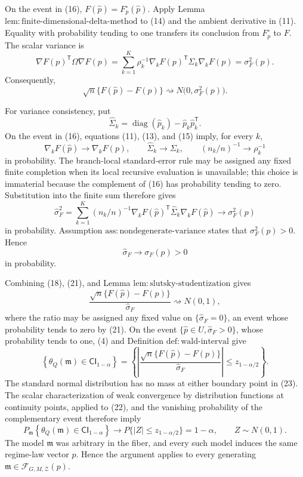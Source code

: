On the event in (16), \(F(\widehat p)=F_p^{\circ}(\widehat p)\).  Apply Lemma \(\mathrm{lem:finite\text{-}dimensional\text{-}delta\text{-}method}\) to (14) and the ambient derivative in (11).  Equality with probability tending to one transfers its conclusion from \(F_p^{\circ}\) to \(F\).  The scalar variance is
\[
 \nabla F(p)^{\mathsf T}\Omega\nabla F(p)
 =\sum_{k=1}^{K}\rho_k^{-1}
   \nabla_kF(p)^{\mathsf T}\Sigma_k\nabla_kF(p)
 =\sigma_F^2(p). \tag{17}
\]
Consequently,
\[
 \sqrt n\{F(\widehat p)-F(p)\}
 \rightsquigarrow N\bigl(0,\sigma_F^2(p)\bigr). \tag{18}
\]

For variance consistency, put
\[
 \widehat\Sigma_k
 =\operatorname{diag}(\widehat p_k)
  -\widehat p_k\widehat p_k^{\mathsf T}.
\]
On the event in (16), equations (11), (13), and (15) imply, for every \(k\),
\[
 \nabla_kF(\widehat p)\to\nabla_kF(p),
 \qquad
 \widehat\Sigma_k\to\Sigma_k,
 \qquad
 (n_k/n)^{-1}\to\rho_k^{-1} \tag{19}
\]
in probability.  The branch-local standard-error rule may be assigned any fixed finite completion when its local recursive evaluation is unavailable; this choice is immaterial because the complement of (16) has probability tending to zero.  Substitution into the finite sum therefore gives
\[
 \widehat\sigma_F^2
 =\sum_{k=1}^{K}(n_k/n)^{-1}
   \nabla_kF(\widehat p)^{\mathsf T}
   \widehat\Sigma_k
   \nabla_kF(\widehat p)
 \longrightarrow\sigma_F^2(p) \tag{20}
\]
in probability.  Assumption \(\mathrm{ass:nondegenerate\text{-}variance}\) states that \(\sigma_F^2(p)>0\).  Hence
\[
 \widehat\sigma_F\longrightarrow\sigma_F(p)>0 \tag{21}
\]
in probability.

Combining (18), (21), and Lemma \(\mathrm{lem:slutsky\text{-}studentization}\) gives
\[
 \frac{\sqrt n\{F(\widehat p)-F(p)\}}
      {\widehat\sigma_F}
 \rightsquigarrow N(0,1), \tag{22}
\]
where the ratio may be assigned any fixed value on \(\{\widehat\sigma_F=0\}\), an event whose probability tends to zero by (21).  On the event \(\{\widehat p\in U,\widehat\sigma_F>0\}\), whose probability tends to one, (4) and Definition \(\mathrm{def:wald\text{-}interval}\) give
\[
 \left\{
 \theta_Q(\mathfrak m)\in\mathsf{CI}_{1-\alpha}
 \right\}
 =
 \left\{
 \left|
 \frac{\sqrt n\{F(\widehat p)-F(p)\}}
      {\widehat\sigma_F}
 \right|
 \leq z_{1-\alpha/2}
 \right\}. \tag{23}
\]
The standard normal distribution has no mass at either boundary point in (23).  The scalar characterization of weak convergence by distribution functions at continuity points, applied to (22), and the vanishing probability of the complementary event therefore imply
\[
 P_{\mathfrak m}\!\left\{
 \theta_Q(\mathfrak m)\in\mathsf{CI}_{1-\alpha}
 \right\}
 \longrightarrow
 P\{|Z|\leq z_{1-\alpha/2}\}
 =1-\alpha,
 \qquad Z\sim N(0,1). \tag{24}
\]
The model \(\mathfrak m\) was arbitrary in the fiber, and every such model induces the same regime-law vector \(p\).  Hence the argument applies to every generating \(\mathfrak m\in\mathcal F_{G,M,\mathcal Z}(p)\).

